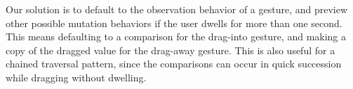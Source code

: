 Our solution is to default to the observation behavior of a gesture, and preview
other possible mutation behaviors if the user dwells for more than one second.
This means defaulting to a comparison for the drag-into gesture, and making a
copy of the dragged value for the drag-away gesture.
%
This is also useful for a chained traversal pattern, since the comparisons
can occur in quick succession while dragging without dwelling.

